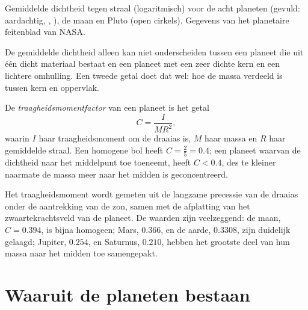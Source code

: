\begin{omfigure}
{\small Gemiddelde dichtheid tegen straal (logaritmisch) voor de acht planeten (gevuld: aardachtig,
, ), de maan en Pluto (open cirkels). Gegevens van het planetaire
feitenblad van NASA.}
\end{omfigure}

De gemiddelde dichtheid alleen kan niet onderscheiden tussen een planeet die uit één dicht
materiaal bestaat en een planeet met een zeer dichte kern en een lichtere omhulling. Een tweede
getal doet dat wel: hoe de massa verdeeld is tussen kern en oppervlak.

\begin{definition}[Traagheidsmomentfactor]\label{def:b1:comparative-planetology:moi}
De \emph{traagheidsmomentfactor} van een planeet is het getal
\[
  C = \frac{I}{MR^2} ,
\]
waarin $I$ haar traagheidsmoment om de draaias is, $M$ haar massa en $R$ haar gemiddelde straal.
Een homogene bol heeft $C = \tfrac25 = 0.4$; een planeet waarvan de dichtheid naar het middelpunt
toe toeneemt, heeft $C < 0.4$, des te kleiner naarmate de massa meer naar het midden is
geconcentreerd.
\end{definition}

Het traagheidsmoment wordt gemeten uit de langzame precessie van de draaias onder de aantrekking
van de zon, samen met de afplatting van het zwaartekrachtsveld van de planeet. De waarden zijn
veelzeggend: de maan, $C = 0.394$, is bijna homogeen; Mars, $0.366$, en de aarde, $0.3308$, zijn
duidelijk gelaagd; Jupiter, $0.254$, en Saturnus, $0.210$, hebben het grootste deel van hun massa
naar het midden toe samengepakt.

\section{Waaruit de planeten bestaan}

